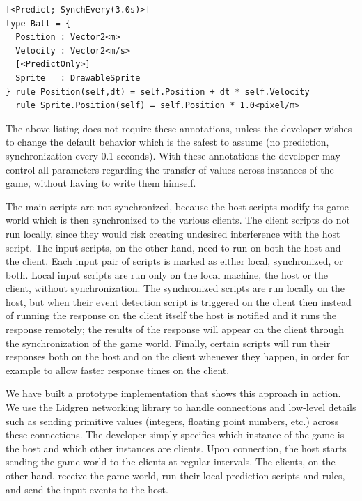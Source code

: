 \begin{lstlisting}
[<Predict; SynchEvery(3.0s)>]
type Ball = {
  Position : Vector2<m>
  Velocity : Vector2<m/s>
  [<PredictOnly>]
  Sprite   : DrawableSprite
} rule Position(self,dt) = self.Position + dt * self.Velocity
  rule Sprite.Position(self) = self.Position * 1.0<pixel/m>
\end{lstlisting}

The above listing does not require these annotations, unless the developer wishes to change the default behavior which is the safest to assume (no prediction, synchronization every 0.1 seconds). With these annotations the developer may control all parameters regarding the transfer of values across instances of the game, without having to write them himself. 

The main scripts are not synchronized, because the host scripts modify its game world which is then synchronized to the various clients. The client scripts do not run locally, since they would risk creating undesired interference with the host script. The input scripts, on the other hand, need to run on both the host and the client. Each input pair of scripts is marked as either local, synchronized, or both. Local input scripts are run only on the local machine, the host or the client, without synchronization. The synchronized scripts are run locally on the host, but when their event detection script is triggered on the client then instead of running the response on the client itself the host is notified and it runs the response remotely; the results of the response will appear on the client through the synchronization of the game world. Finally, certain scripts will run their responses both on the host and on the client whenever they happen, in order for example to allow faster response times on the client.

We have built a prototype implementation that shows this approach in action. We use the Lidgren networking library \cite{APPENDIX_B_LIDGREN} to handle connections and low-level details such as sending primitive values (integers, floating point numbers, etc.) across these connections. The developer simply specifies which instance of the game is the host and which other instances are clients. Upon connection, the host starts sending the game world to the clients at regular intervals. The clients, on the other hand, receive the game world, run their local prediction scripts and rules, and send the input events to the host. 

